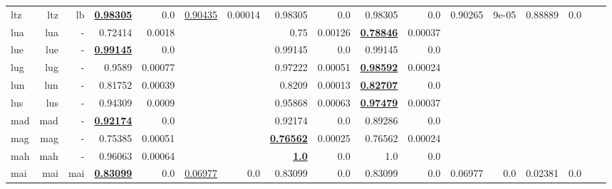 \documentclass[11pt]{article}
\begin{document}
\begin{table*}[h]
{\begin{tabular}{lrrrrrrrrrrrrrrrr}
ltz         & ltz         & lb         & \textbf{\underline{0.98305}}         & 0.0         & \underline{0.90435}         & 0.00014         & 0.98305         & 0.0         & 0.98305         & 0.0         & 0.90265         & 9e-05         & 0.88889         & 0.0         \\
lua         & lua         & -         & 0.72414         & 0.0018         &          &          & 0.75         & 0.00126         & \textbf{\underline{0.78846}}         & 0.00037         &          &          &          &          \\
lue         & lue         & -         & \textbf{\underline{0.99145}}         & 0.0         &          &          & 0.99145         & 0.0         & 0.99145         & 0.0         &          &          &          &          \\
lug         & lug         & -         & 0.9589         & 0.00077         &          &          & 0.97222         & 0.00051         & \textbf{\underline{0.98592}}         & 0.00024         &          &          &          &          \\
lun         & lun         & -         & 0.81752         & 0.00039         &          &          & 0.8209         & 0.00013         & \textbf{\underline{0.82707}}         & 0.0         &          &          &          &          \\
lus         & lus         & -         & 0.94309         & 0.0009         &          &          & 0.95868         & 0.00063         & \textbf{\underline{0.97479}}         & 0.00037         &          &          &          &          \\
mad         & mad         & -         & \textbf{\underline{0.92174}}         & 0.0         &          &          & 0.92174         & 0.0         & 0.89286         & 0.0         &          &          &          &          \\
mag         & mag         & -         & 0.75385         & 0.00051         &          &          & \textbf{\underline{0.76562}}         & 0.00025         & 0.76562         & 0.00024         &          &          &          &          \\
mah         & mah         & -         & 0.96063         & 0.00064         &          &          & \textbf{\underline{1.0}}         & 0.0         & 1.0         & 0.0         &          &          &          &          \\
mai         & mai         & mai         & \textbf{\underline{0.83099}}         & 0.0         & \underline{0.06977}         & 0.0         & 0.83099         & 0.0         & 0.83099         & 0.0         & 0.06977         & 0.0         & 0.02381         & 0.0         \\

\end{tabular}}
\end{table*}
\end{document}
